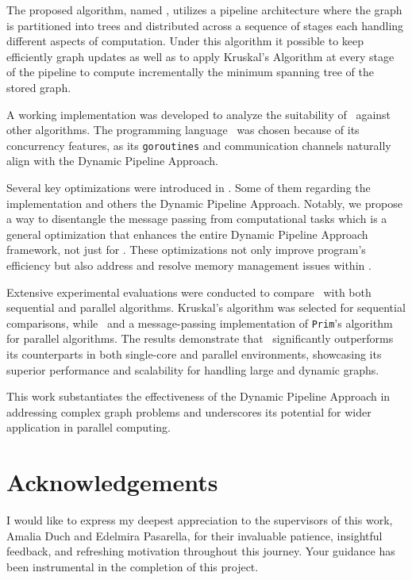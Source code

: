 The proposed algorithm, named \DPmst, utilizes a pipeline architecture where the graph is partitioned into trees and distributed across a sequence of stages each handling different aspects of computation. Under this algorithm it possible to keep efficiently graph updates as well as to apply Kruskal's Algorithm at every stage of the pipeline to compute incrementally the minimum spanning tree of the stored graph.

A working implementation was developed to analyze the suitability of \DPmst\ against other algorithms. The programming language \Go\ was chosen because of its concurrency features, as its {\tt goroutines} and  communication channels naturally align with the Dynamic Pipeline Approach.

Several key optimizations were introduced in \DPmst. Some of them regarding the implementation and others the Dynamic Pipeline Approach. Notably, we propose a way to disentangle the message passing from computational tasks which is a general optimization that enhances the entire Dynamic Pipeline Approach framework, not just for \DPmst. These optimizations not only improve program's efficiency but also address and resolve memory management issues within \Go.

Extensive experimental evaluations were conducted to compare \DPmst\ with both sequential and parallel algorithms. Kruskal's algorithm was selected for sequential comparisons, while \FKruskal\ and a message-passing implementation of {\tt Prim}'s algorithm for parallel algorithms. The results demonstrate that \DPmst\ significantly outperforms its counterparts in both single-core and parallel environments, showcasing its superior performance and scalability for handling large and dynamic graphs. 

This work substantiates the effectiveness of the Dynamic Pipeline Approach in addressing complex graph problems and underscores its potential for wider application in parallel computing.


\chapter*{Acknowledgements}
I would like to express my deepest appreciation to the supervisors of this work, Amalia Duch and Edelmira Pasarella, for their invaluable patience, insightful feedback, and refreshing motivation throughout this journey. Your guidance has been instrumental in the completion of this project.


